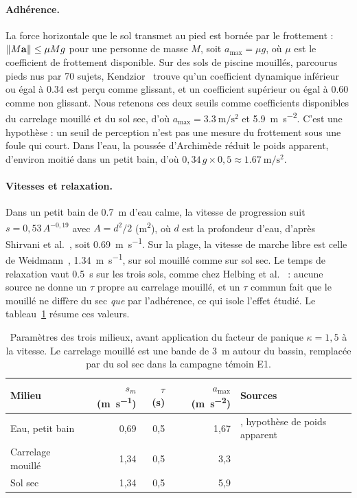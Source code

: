 \paragraph{Adhérence.}
La force horizontale que le sol transmet au pied est bornée par le frottement :
$\left\lVert M\mathbf{a} \right\rVert\leq\mu M g$ pour une personne de masse $M$, soit
$a_{\max}=\mu g$, où $\mu$ est le coefficient de frottement disponible. Sur des
sols de piscine mouillés, parcourus pieds nus par 70 sujets,
Kendzior~\cite{kendzior2023} trouve qu'un coefficient dynamique inférieur ou
égal à \num{0.34} est perçu comme glissant, et un coefficient supérieur ou égal
à \num{0.60} comme non glissant. Nous retenons ces deux seuils comme coefficients
disponibles du carrelage mouillé et du sol sec, d'où
$a_{\max}=\SI{3.3}{\metre\per\second\squared}$ et
\SI{5.9}{\metre\per\second\squared}. C'est une hypothèse : un seuil de
perception n'est pas une mesure du frottement sous une foule qui court. Dans
l'eau, la poussée d'Archimède réduit le poids apparent, d'environ moitié dans
un petit bain, d'où $0{,}34\,g\times 0{,}5\approx\SI{1.67}{\metre\per\second\squared}$.

\paragraph{Vitesses et relaxation.}
Dans un petit bain de \SI{0.7}{\metre} d'eau calme, la vitesse de progression
suit $s=0{,}53\,A^{-0{,}19}$ avec $A=d^2/2$ (\si{\metre\squared}), où $d$ est la profondeur d'eau, d'après
Shirvani et al.~\cite{shirvani2020}, soit \SI{0.69}{\metre\per\second}. Sur la
plage, la vitesse de marche libre est celle de
Weidmann~\cite{weidmann1993}, \SI{1.34}{\metre\per\second}, sur sol mouillé
comme sur sol sec. Le temps de relaxation vaut \SI{0.5}{\second} sur les trois
sols, comme chez Helbing et al.~\cite{helbing2000} : aucune source ne donne un
$\tau$ propre au carrelage mouillé, et un $\tau$ commun fait que le mouillé ne
diffère du sec \emph{que} par l'adhérence, ce qui isole l'effet étudié. Le
tableau~\ref{tab:milieux} résume ces valeurs.

\begin{table}[ht]
\centering
\caption{Paramètres des trois milieux, avant application du facteur de panique
$\kappa=1{,}5$ à la vitesse. Le carrelage mouillé est une bande de
\SI{3}{\metre} autour du bassin, remplacée par du sol sec dans la campagne
témoin E1.}
\label{tab:milieux}
\begin{tabular}{lrrrl}
\toprule
Milieu & $s_m$ (\si{\metre\per\second}) & $\tau$ (\si{\second})
& $a_{\max}$ (\si{\metre\per\second\squared}) & Sources \\
\midrule
Eau, petit bain & 0,69 & 0,5 & 1,67 & \cite{shirvani2020}, hypothèse de poids apparent \\
Carrelage mouillé & 1,34 & 0,5 & 3,3 & \cite{weidmann1993,kendzior2023} \\
Sol sec & 1,34 & 0,5 & 5,9 & \cite{weidmann1993,kendzior2023} \\
\bottomrule
\end{tabular}
\end{table}

